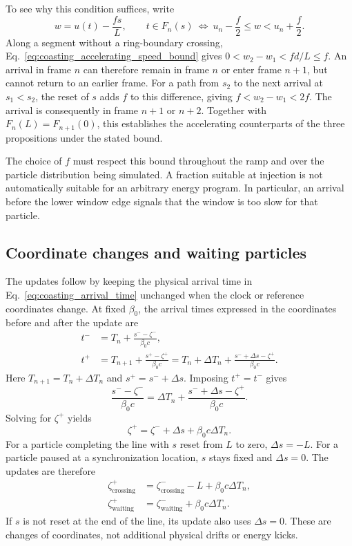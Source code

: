 To see why this condition suffices, write
\begin{equation}
w=u(t)-\frac{fs}{L},\qquad
 t\in F_n(s)\ \Longleftrightarrow\
 u_n-\frac f2\leq w<u_n+\frac f2.
\end{equation}
Along a segment without a ring-boundary crossing, Eq.~\ref{eq:coasting_accelerating_speed_bound}
gives $0<w_2-w_1<fd/L\leq f$. An arrival in frame $n$ can therefore remain in
frame $n$ or enter frame $n+1$, but cannot return to an earlier frame.
For a path from $s_2$ to the next arrival at $s_1<s_2$, the reset of $s$ adds
$f$ to this difference, giving $f<w_2-w_1<2f$. The arrival is consequently
in frame $n+1$ or $n+2$. Together with $F_n(L)=F_{n+1}(0)$, this establishes
the accelerating counterparts of the three propositions under the stated bound.

The choice of $f$ must respect this bound throughout the ramp and over the
particle distribution being simulated. A fraction suitable at injection is
not automatically suitable for an arbitrary energy program. In particular,
an arrival before the lower window edge signals that the window is too slow
for that particle.

\subsection{Coordinate changes and waiting particles}

The updates follow by keeping the physical arrival time in
Eq.~\ref{eq:coasting_arrival_time} unchanged when the clock or reference
coordinates change. At fixed $\beta_0$, the arrival times expressed in the
coordinates before and after the update are
\begin{align}
t^- &= T_n + \frac{s^- - \zeta^-}{\beta_0c},\\
t^+ &= T_{n+1} + \frac{s^+ - \zeta^+}{\beta_0c}
     = T_n + \Delta T_n
       + \frac{s^- + \Delta s - \zeta^+}{\beta_0c}.
\end{align}
Here $T_{n+1}=T_n+\Delta T_n$ and $s^+=s^-+\Delta s$.
Imposing $t^+=t^-$ gives
\begin{equation}
\frac{s^- - \zeta^-}{\beta_0c}
= \Delta T_n + \frac{s^- + \Delta s - \zeta^+}{\beta_0c}.
\end{equation}
Solving for $\zeta^+$ yields
\begin{equation}
\boxed{\zeta^+=\zeta^-+\Delta s+\beta_0c\Delta T_n.}
\label{eq:coasting_clock_zeta_update}
\end{equation}
For a particle completing the line with $s$ reset from $L$ to zero,
$\Delta s=-L$. For a particle paused at a synchronization location, $s$ stays
fixed and $\Delta s=0$. The updates are therefore
\begin{align}
\zeta^+_{\text{crossing}}&=\zeta^-_{\text{crossing}}-L+\beta_0c\Delta T_n,\\
\zeta^+_{\text{waiting}}&=\zeta^-_{\text{waiting}}+\beta_0c\Delta T_n.
\end{align}
If $s$ is not reset at the end of the line, its update also uses $\Delta s=0$.
These are changes of coordinates, not additional physical drifts or energy kicks.

